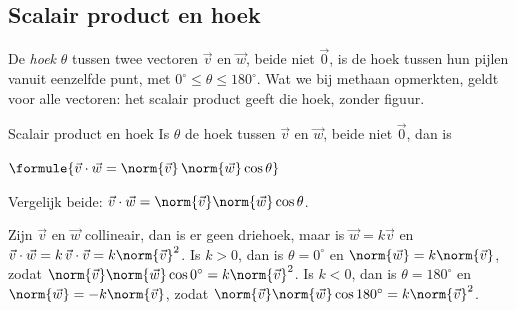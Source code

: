 \begin{oefeningen}
\end{oefeningen}

\subsection{Scalair product en hoek}

De \textit{hoek} $\theta$ tussen twee vectoren $\vec v$ en $\vec w$, beide niet $\vec 0$, is de hoek tussen hun pijlen vanuit eenzelfde punt, met $0^\circ \leqslant \theta \leqslant 180^\circ$. Wat we bij methaan opmerkten, geldt voor alle vectoren: het scalair product geeft die hoek, zonder figuur.

\begin{theorie}
\begin{stelling}{Scalair product en hoek}
Is $\theta$ de hoek tussen $\vec v$ en $\vec w$, beide niet $\vec 0$, dan is

\vspace{1mm}
\qquad $\formule{\vec v \cdot \vec w = \norm{\vec v}\,\norm{\vec w}\cos\theta}$
\end{stelling}
\begin{bewijs}
Vergelijk beide: $\vec v \cdot \vec w = \norm{\vec v}\norm{\vec w}\cos\theta$.

Zijn $\vec v$ en $\vec w$ collineair, dan is er geen driehoek, maar is $\vec w = k\vec v$ en $\vec v \cdot \vec w = k\,\vec v \cdot \vec v = k\norm{\vec v}^2$. Is $k > 0$, dan is $\theta = 0^\circ$ en $\norm{\vec w} = k\norm{\vec v}$, zodat $\norm{\vec v}\norm{\vec w}\cos 0^\circ = k\norm{\vec v}^2$. Is $k < 0$, dan is $\theta = 180^\circ$ en $\norm{\vec w} = -k\norm{\vec v}$, zodat $\norm{\vec v}\norm{\vec w}\cos 180^\circ = k\norm{\vec v}^2$.
\end{bewijs}
\end{theorie}

